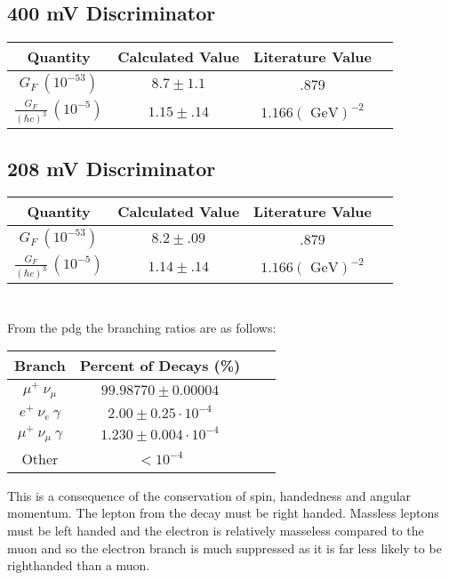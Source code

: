 \documentclass[11pt,letterpaper]{article}
\begin{document}
\section{}%
\subsection{400 mV Discriminator}
\begin{center}
	\begin{tabular}{|c|c|c|c|}\hline
		Quantity & Calculated Value & Literature Value\\ \hline\hline
		 $G_F\ (10^{-53})$& $8.7 \pm 1.1 $ & .879  \\ \hline
		$\frac{G_F}{(\hbar c)^3}\ (10^{-5}) $ &$ 1.15 \pm .14 $ &$ 1.166 (\text{ GeV})^{-2}$\\ \hline
	\end{tabular}
\end{center}
\subsection{208 mV Discriminator}
\begin{center}
	\begin{tabular}{|c|c|c|c|}\hline
		Quantity & Calculated Value & Literature Value\\ \hline\hline
		 $G_F\ (10^{-53})$& $8.2 \pm .09 $ & .879  \\ \hline
		$\frac{G_F}{(\hbar c)^3}\ (10^{-5}) $ &$ 1.14 \pm .14 $ &$ 1.166 (\text{ GeV})^{-2}$\\ \hline
	\end{tabular}
\end{center}
\section{}%
From the pdg the branching ratios are as follows:
\begin{center}
	\begin{tabular}{|c|c|c|c|}\hline
		Branch & Percent of Decays (\%)\\ \hline\hline
		 $\mu^+\ \nu_{\mu}$& $99.98770 \pm 0.00004$ \\ \hline
		 $e^+\ \nu_{e}\ \gamma$& $2.00 \pm 0.25 \cdot 10^{-4}$\\ \hline
		 $\mu^+\ \nu_{\mu}\ \gamma$& $1.230 \pm 0.004 \cdot 10^{-4}$\\ \hline
         Other & $<10^{-4}$ \\ \hline
	\end{tabular}
\end{center}
This is a consequence of the conservation of spin, handedness and angular momentum. The lepton from the decay must be right handed. Massless leptons must be left handed and the electron is relatively masseless compared to the muon and so the electron branch is much suppressed as it is far less likely to be righthanded than a muon.
\end{document}
